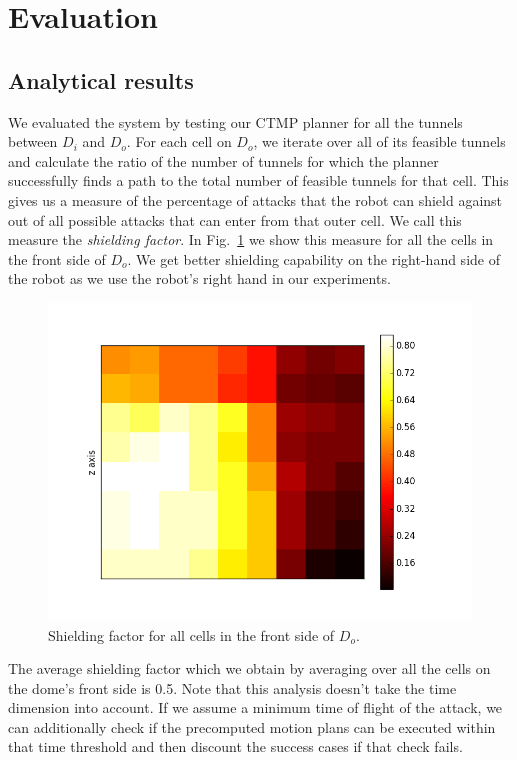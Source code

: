 \documentclass[a4paper]{report}
\begin{document}
\section{Evaluation}
\subsection{Analytical results}
We evaluated the system by testing our CTMP planner for all the tunnels between $D_i$ and $D_o$. For each cell on $D_o$, we iterate over all of its feasible tunnels and calculate the ratio of the number of tunnels for which the planner successfully finds a path to the total number of feasible tunnels for that cell. This gives us a measure of the percentage of attacks that the robot can shield against out of all possible attacks that can enter from that outer cell. We call this measure the \emph{shielding factor}. In Fig.~\ref{fig:coverage_front} we show this measure for all the cells in the front side of $D_o$. We get better shielding capability on the right-hand side of the robot as we use the robot's right hand in our experiments.

\begin{figure}[ht]
\centering
\includegraphics[width=0.8\columnwidth]{heatmap1}
\caption{Shielding factor for all cells in the front side of $D_o$.}
\label{fig:coverage_front}
\end{figure}

The average shielding factor which we obtain by averaging over all the cells on the dome's front side is 0.5. Note that this analysis doesn't take the time dimension into account. If we assume a minimum time of flight of the attack, we can additionally check if the precomputed motion plans can be executed within that time threshold and then discount the success cases if that check fails.
\end{document}
